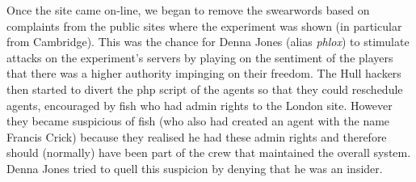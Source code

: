 Once the site came on-line, we began to remove the swearwords based on complaints from the public sites where the 
experiment was shown (in particular from Cambridge). This was the chance for Denna Jones (alias {\it phlox}) to stimulate 
attacks on the experiment's servers by playing on the sentiment of the players that there was a higher authority 
impinging on their freedom. The Hull hackers then started to divert the php script of the agents so that they 
could reschedule agents, encouraged by fish who had admin rights to the London site. However they became suspicious
of fish (who also had created an agent with the name Francis Crick)
because they realised he had these admin rights and therefore should (normally) have been part of the 
crew that maintained the overall system. Denna Jones tried to quell this suspicion by denying that he was an insider. 

